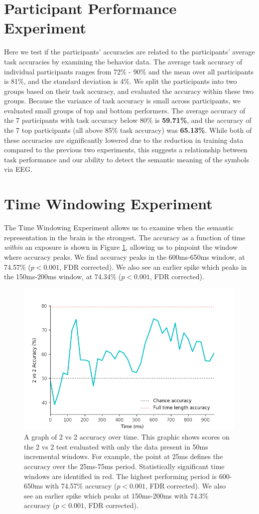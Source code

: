 \section{Participant Performance Experiment} Here we test if the participants' 
\tvt accuracies are related to the participants' average task accuracies by 
examining the behavior data. The average task accuracy of individual 
participants ranges from 72\% - 90\% and the mean over all participants is 
81\%, and the standard deviation is 4\%. We split the participants into two 
groups based on their task accuracy, and evaluated the \tvt accuracy within 
these two groups. Because the variance of task accuracy is small across 
participants, we evaluated small groups of top and bottom performers. The 
average \tvt accuracy of the 7 participants with task accuracy below 80\% is 
{\bf 59.71\%}, and the \tvt accuracy of the 7 top participants (all above 85\% 
task accuracy) was {\bf 65.13\%}. While both of these \tvt accuracies are 
significantly lowered due to the reduction in training data compared to the 
previous two experiments, this suggests a relationship between task performance 
and our ability to detect the semantic meaning of the symbols via EEG.

\section{Time Windowing Experiment} The Time Windowing Experiment allows us to 
examine when the semantic representation in the brain is the strongest. The 
\tvt accuracy as a function of time \emph{within} an exposure is shown in 
Figure \ref{fig:timewindow}, allowing us to pinpoint the window where accuracy 
peaks. We find accuracy peaks in the 600ms-650ms window, at 74.57\% ($p < 
0.001$, FDR corrected). We also see an earlier spike which peaks in the 
150ms-200ms window, at 74.34\% ($p < 0.001$, FDR corrected).

\begin{figure}[t]
  \centering
  \includegraphics[width=0.75\linewidth]{figures/timewindow}
  \caption{A graph of 2 vs 2 accuracy over time. This graphic shows scores on the 2 vs 2 test evaluated with only the data present in 50ms incremental windows. For example, the point at 25ms defines the \tvt accuracy over the 25ms-75ms period. Statistically significant time windows are identified in red. The highest performing period is 600-650ms with 74.57\% accuracy ($p < 0.001$, FDR corrected). We also see an earlier spike which peaks at 150ms-200ms with 74.3\% accuracy ($p < 0.001$, FDR corrected).}
  \label{fig:timewindow}
\end{figure}

